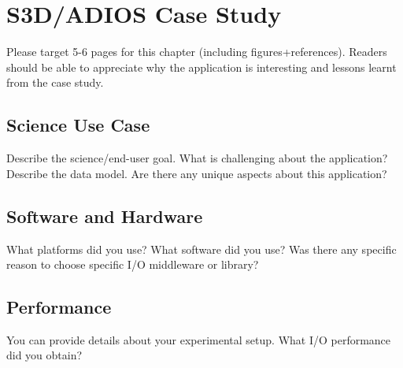 
\chapter{S3D/ADIOS Case Study}
\label{part4-ch5-s3d}

Please target 5-6 pages for this chapter (including figures+references). Readers should be able to appreciate why the application is interesting and lessons learnt from the case study.

\section{Science Use Case}
Describe the science/end-user goal. What is challenging about the application? Describe the data model.
Are there any unique aspects about this application? 

\section{Software and Hardware}
What platforms did you use? What software did you use? Was there any specific reason to choose specific I/O middleware or library?

\section{Performance}
You can provide details about your experimental setup. What I/O performance did you obtain? 


